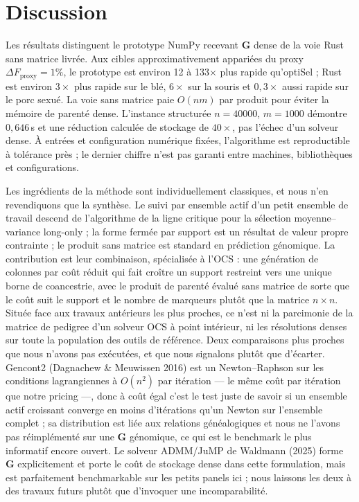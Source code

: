 \documentclass[11pt]{article}
\newcommand{\bG}{\mathbf{G}}
\begin{document}
\section{Discussion}

Les résultats distinguent le prototype NumPy recevant $\bG$ dense de la voie Rust sans matrice livrée. Aux cibles approximativement appariées du proxy $\Delta F_{\mathrm{proxy}}=1\%$, le prototype est environ 12 à 133$\times$ plus rapide qu'optiSel ; Rust est environ $3\times$ plus rapide sur le blé, $6\times$ sur la souris et $0{,}3\times$ aussi rapide sur le porc sexué. La voie sans matrice paie $O(nm)$ par produit pour éviter la mémoire de parenté dense. L'instance structurée $n=40000$, $m=1000$ démontre $0{,}646$\,s et une réduction calculée de stockage de $40\times$, pas l'échec d'un solveur dense. À entrées et configuration numérique fixées, l'algorithme est reproductible à tolérance près ; le dernier chiffre n'est pas garanti entre machines, bibliothèques et configurations.

Les ingrédients de la méthode sont individuellement classiques, et nous n'en revendiquons que la synthèse. Le suivi par ensemble actif d'un petit ensemble de travail descend de l'algorithme de la ligne critique pour la sélection moyenne--variance long-only ; la forme fermée par support est un résultat de valeur propre contrainte ; le produit sans matrice est standard en prédiction génomique. La contribution est leur combinaison, spécialisée à l'OCS : une génération de colonnes par coût réduit qui fait croître un support restreint vers une unique borne de coancestrie, avec le produit de parenté évalué sans matrice de sorte que le coût suit le support et le nombre de marqueurs plutôt que la matrice $n\times n$. Située face aux travaux antérieurs les plus proches, ce n'est ni la parcimonie de la matrice de pedigree d'un solveur OCS à point intérieur, ni les résolutions denses sur toute la population des outils de référence. Deux comparaisons plus proches que nous n'avons pas exécutées, et que nous signalons plutôt que d'écarter. Gencont2 (Dagnachew \& Meuwissen 2016) est un Newton--Raphson sur les conditions lagrangiennes à $O(n^2)$ par itération --- le même coût par itération que notre pricing ---, donc à coût égal c'est le test juste de savoir si un ensemble actif croissant converge en moins d'itérations qu'un Newton sur l'ensemble complet ; sa distribution est liée aux relations généalogiques et nous ne l'avons pas réimplémenté sur une $\bG$ génomique, ce qui est le benchmark le plus informatif encore ouvert. Le solveur ADMM/JuMP de Waldmann (2025) forme $\bG$ explicitement et porte le coût de stockage dense dans cette formulation, mais est parfaitement benchmarkable sur les petits panels ici ; nous laissons les deux à des travaux futurs plutôt que d'invoquer une incomparabilité.
\end{document}
